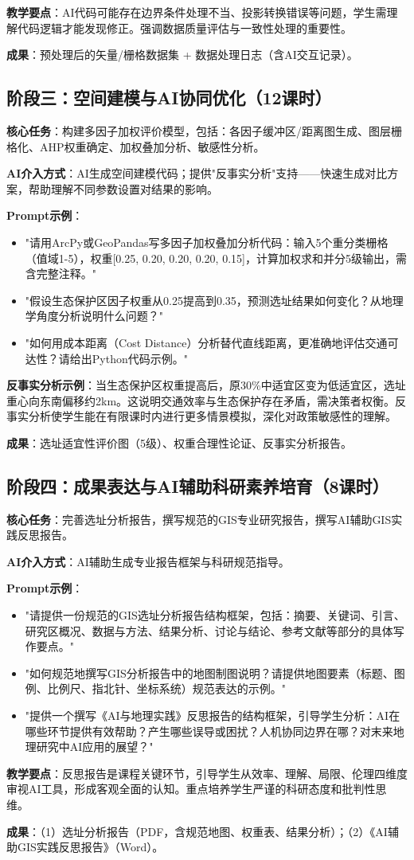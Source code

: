 \textbf{教学要点}：AI代码可能存在边界条件处理不当、投影转换错误等问题，学生需理解代码逻辑才能发现修正。强调数据质量评估与一致性处理的重要性。

\textbf{成果}：预处理后的矢量/栅格数据集 + 数据处理日志（含AI交互记录）。

\subsection{阶段三：空间建模与AI协同优化（12课时）}

\textbf{核心任务}：构建多因子加权评价模型，包括：各因子缓冲区/距离图生成、图层栅格化、AHP权重确定、加权叠加分析、敏感性分析。

\textbf{AI介入方式}：AI生成空间建模代码；提供"反事实分析"支持——快速生成对比方案，帮助理解不同参数设置对结果的影响。

\textbf{Prompt示例}：
\begin{itemize}
\item "请用ArcPy或GeoPandas写多因子加权叠加分析代码：输入5个重分类栅格（值域1-5），权重[0.25, 0.20, 0.20, 0.20, 0.15]，计算加权求和并分5级输出，需含完整注释。"
\item "假设生态保护区因子权重从0.25提高到0.35，预测选址结果如何变化？从地理学角度分析说明什么问题？"
\item "如何用成本距离（Cost Distance）分析替代直线距离，更准确地评估交通可达性？请给出Python代码示例。"
\end{itemize}

\textbf{反事实分析示例}：当生态保护区权重提高后，原30\%中适宜区变为低适宜区，选址重心向东南偏移约2km。这说明交通效率与生态保护存在矛盾，需决策者权衡。反事实分析使学生能在有限课时内进行更多情景模拟，深化对政策敏感性的理解。

\textbf{成果}：选址适宜性评价图（5级）、权重合理性论证、反事实分析报告。

\subsection{阶段四：成果表达与AI辅助科研素养培育（8课时）}

\textbf{核心任务}：完善选址分析报告，撰写规范的GIS专业研究报告，撰写AI辅助GIS实践反思报告。

\textbf{AI介入方式}：AI辅助生成专业报告框架与科研规范指导。

\textbf{Prompt示例}：
\begin{itemize}
\item "请提供一份规范的GIS选址分析报告结构框架，包括：摘要、关键词、引言、研究区概况、数据与方法、结果分析、讨论与结论、参考文献等部分的具体写作要点。"
\item "如何规范地撰写GIS分析报告中的地图制图说明？请提供地图要素（标题、图例、比例尺、指北针、坐标系统）规范表达的示例。"
\item "提供一个撰写《AI与地理实践》反思报告的结构框架，引导学生分析：AI在哪些环节提供有效帮助？产生哪些误导或困扰？人机协同边界在哪？对末来地理研究中AI应用的展望？"
\end{itemize}

\textbf{教学要点}：反思报告是课程关键环节，引导学生从效率、理解、局限、伦理四维度审视AI工具，形成客观全面的认知。重点培养学生严谨的科研态度和批判性思维。

\textbf{成果}：（1）选址分析报告（PDF，含规范地图、权重表、结果分析）；（2）《AI辅助GIS实践反思报告》（Word）。